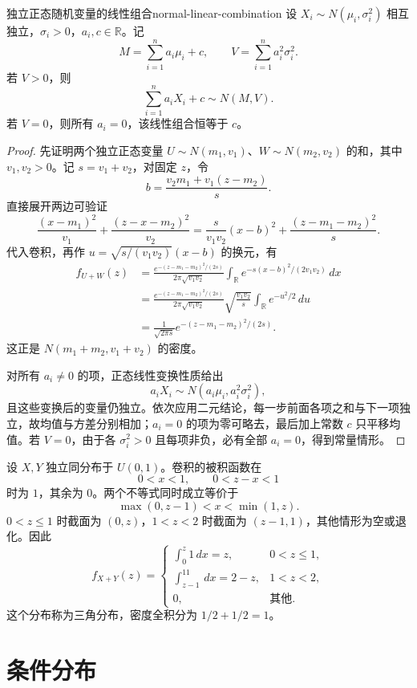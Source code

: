 \begin{mytheorem}{独立正态随机变量的线性组合}{normal-linear-combination}
设 $X_i\sim N(\mu_i,\sigma_i^2)$ 相互独立，$\sigma_i>0$，$a_i,c\in\mathbb R$。记
\[
M=\sum_{i=1}^na_i\mu_i+c,\qquad V=\sum_{i=1}^na_i^2\sigma_i^2.
\]
若 $V>0$，则
\[
\sum_{i=1}^na_iX_i+c\sim N(M,V).
\]
若 $V=0$，则所有 $a_i=0$，该线性组合恒等于 $c$。
\end{mytheorem}
\begin{proof}
先证明两个独立正态变量 $U\sim N(m_1,v_1)$、$W\sim N(m_2,v_2)$ 的和，其中 $v_1,v_2>0$。记 $s=v_1+v_2$，对固定 $z$，令
\[
b=\frac{v_2m_1+v_1(z-m_2)}s.
\]
直接展开两边可验证
\[
\frac{(x-m_1)^2}{v_1}+\frac{(z-x-m_2)^2}{v_2}
=\frac{s}{v_1v_2}(x-b)^2+\frac{(z-m_1-m_2)^2}s.
\]
代入卷积，再作 $u=\sqrt{s/(v_1v_2)}(x-b)$ 的换元，有
\begin{align*}
f_{U+W}(z)
&=\frac{e^{-(z-m_1-m_2)^2/(2s)}}{2\pi\sqrt{v_1v_2}}
 \int_{\mathbb R}e^{-s(x-b)^2/(2v_1v_2)}\,dx\\
&=\frac{e^{-(z-m_1-m_2)^2/(2s)}}{2\pi\sqrt{v_1v_2}}
 \sqrt{\frac{v_1v_2}s}\int_{\mathbb R}e^{-u^2/2}\,du\\
&=\frac1{\sqrt{2\pi s}}e^{-(z-m_1-m_2)^2/(2s)}.
\end{align*}
这正是 $N(m_1+m_2,v_1+v_2)$ 的密度。

对所有 $a_i\ne0$ 的项，正态线性变换性质给出
\[
a_iX_i\sim N(a_i\mu_i,a_i^2\sigma_i^2),
\]
且这些变换后的变量仍独立。依次应用二元结论，每一步前面各项之和与下一项独立，故均值与方差分别相加；$a_i=0$ 的项为零可略去，最后加上常数 $c$ 只平移均值。若 $V=0$，由于各 $\sigma_i^2>0$ 且每项非负，必有全部 $a_i=0$，得到常量情形。
\end{proof}

\begin{example}[两个独立均匀变量之和]
设 $X,Y$ 独立同分布于 $U(0,1)$。卷积的被积函数在
\[
0<x<1,\qquad 0<z-x<1
\]
时为 $1$，其余为 $0$。两个不等式同时成立等价于
\[
\max(0,z-1)<x<\min(1,z).
\]
$0<z\leq1$ 时截面为 $(0,z)$，$1<z<2$ 时截面为 $(z-1,1)$，其他情形为空或退化。因此
\[
f_{X+Y}(z)=
\begin{cases}
\displaystyle\int_0^z1\,dx=z,&0<z\leq1,\\
\displaystyle\int_{z-1}^11\,dx=2-z,&1<z<2,\\
0,&\text{其他}.
\end{cases}
\]
这个分布称为三角分布，密度全积分为 $1/2+1/2=1$。
\end{example}

\section{条件分布}
\label{sec:conditional-distributions}

